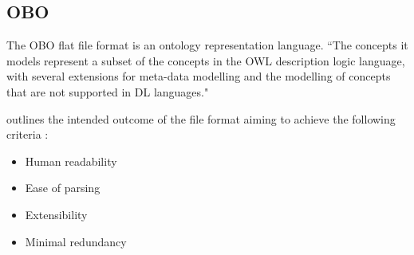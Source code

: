 \subsection{OBO}\label{obo}
The OBO flat file format is an ontology representation language. ``The concepts it models represent a subset of the concepts in the OWL description logic language, with several extensions for meta-data modelling and the modelling of concepts that are not supported in DL languages." \cite{obo}

\cite{obo} outlines the intended outcome of the file format aiming to achieve the following criteria :
\begin{itemize}
\item Human readability
\item Ease of parsing
\item Extensibility
\item Minimal redundancy
\end{itemize}